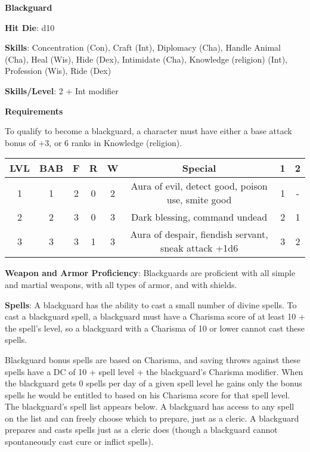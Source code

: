 \textbf{\huge{Blackguard}}

\textbf{Hit Die}: d10

\textbf{Skills}: Concentration (Con), Craft (Int), Diplomacy (Cha), Handle Animal (Cha), Heal (Wis), Hide (Dex), Intimidate (Cha), Knowledge (religion) (Int), Profession (Wis), Ride (Dex)

\textbf{Skills/Level}: 2 + Int modifier

\textbf{\large{Requirements}}

To qualify to become a blackguard, a character must have either a base attack bonus of +3, or 6 ranks in Knowledge (religion).

\begin{center}
\begin{adjustwidth}{-4cm}{}
\begin{small}
\begin{tabular}{| c | c | c | c | c | c | c | c |}
\hline
LVL &BAB &F &R &W &Special &1 &2 \\
\hline
1 &1 &2 &0 &2 &Aura of evil, detect good, poison use, smite good &1 &- \\
2 &2 &3 &0 &3 &Dark blessing, command undead &2 &1 \\
3 &3 &3 &1 &3 &Aura of despair, fiendish servant, sneak attack +1d6 &3 &2 \\
\hline
\end{tabular}
\end{small}
\end{adjustwidth}
\end{center}

\textbf{Weapon and Armor Proficiency}: Blackguards are proficient with all simple and martial weapons, with all types of armor, and with shields.

\textbf{Spells}: A blackguard has the ability to cast a small number of divine spells. To cast a blackguard spell, a blackguard must have a Charisma score of at least 10 + the spell's level, so a blackguard with a Charisma of 10 or lower cannot cast these spells.

Blackguard bonus spells are based on Charisma, and saving throws against these spells have a DC of 10 + spell level + the blackguard's Charisma modifier. When the blackguard gets 0 spells per day of a given spell level he gains only the bonus spells he would be entitled to based on his Charisma score for that spell level. The blackguard's spell list appears below. A blackguard has access to any spell on the list and can freely choose which to prepare, just as a cleric. A blackguard prepares and casts spells just as a cleric does (though a blackguard cannot spontaneously cast cure or inflict spells).

